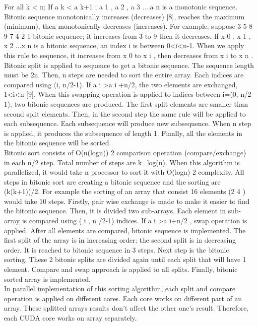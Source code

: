 \documentclass[conference]{IEEEtran}
\begin{document}
For all k < n; If a k < a k+1 ; a 1 , a 2 , a 3 ....a n is a monotonic
sequence. Bitonic sequence monotonically increases
(decreases) [8], reaches the maximum (minimum), then
monotonically decreases (increases). For example, suppose 3
5 8 9 7 4 2 1 bitonic sequence; it increases from 3 to 9 then it
decreases. If x 0 , x 1 , x 2 ...x n is a bitonic sequence, an index i is
between 0<i<n-1. When we apply this rule to sequence, it
increases from x 0 to x i , then decreases from x i to x n . Bitonic
split is applied to sequence to get a bitonic sequence. The
sequence length must be 2n. Then, n steps are needed to sort
the entire array. Each indices are compared using (i, n/2-1). If
a i >a i +n/2, the two elements are exchanged, 1<i<n [9]. When
this swapping operation is applied to indices between i=(0,
n/2-1), two bitonic sequences are produced. The first split
elements are smaller than second split elements. Then, in the second step the same rule will be applied to
each subsequence. Each subsequence will produce new
subsequence. When n step is applied, it produces the
subsequence of length 1. Finally, all the elements in the
bitonic sequence will be sorted.\\

Bitonic sort consists of O(n(logn)) 2 comparison operation
(compare/exchange) in each n/2 step. Total number of steps
are k=log(n). When this algorithm is parallelized, it would
take n processor to sort it with O(logn) 2 complexity. All steps
in bitonic sort are creating a bitonic sequence and the sorting
are (k(k+1))/2. For example the sorting of an array that consist
16 elements (2 4 ) would take 10 steps. Firstly, pair wise exchange is made to
make it easier to find the bitonic sequence. Then, it is divided
two sub-arrays. Each element in sub-array is compared using
( i , n /2-1) indices. If a i >a i+n/2 , swap operation is applied. After
all elements are compared, bitonic sequence is implemented.
The first split of the array is in increasing order; the second
split is in decreasing order. It is reached to bitonic sequence in
3 steps. Next step is the bitonic sorting. These 2 bitonic splits
are divided again until each split that will have 1 element.
Compare and swap approach is applied to all splits. Finally,
bitonic sorted array is implemented.\\

In parallel implementation of this sorting algorithm, each
split and compare operation is applied on different cores. Each
core works on different part of an array. These splitted arrays
results don’t affect the other one’s result. Therefore, each
CUDA core works on array separately.
\end{document}
